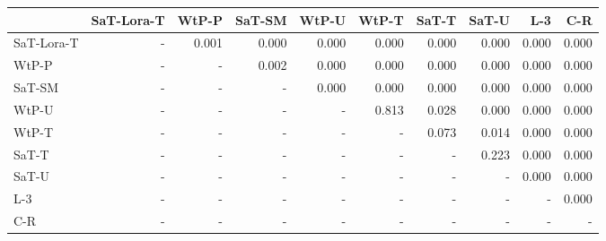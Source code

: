 \begin{tabular}{lrrrrrrrrr}
\toprule
 & SaT-Lora-T & WtP-P & SaT-SM & WtP-U & WtP-T & SaT-T & SaT-U & L-3 & C-R \\
\midrule
SaT-Lora-T & - & 0.001 & 0.000 & 0.000 & 0.000 & 0.000 & 0.000 & 0.000 & 0.000 \\
WtP-P & - & - & 0.002 & 0.000 & 0.000 & 0.000 & 0.000 & 0.000 & 0.000 \\
SaT-SM & - & - & - & 0.000 & 0.000 & 0.000 & 0.000 & 0.000 & 0.000 \\
WtP-U & - & - & - & - & 0.813 & 0.028 & 0.000 & 0.000 & 0.000 \\
WtP-T & - & - & - & - & - & 0.073 & 0.014 & 0.000 & 0.000 \\
SaT-T & - & - & - & - & - & - & 0.223 & 0.000 & 0.000 \\
SaT-U & - & - & - & - & - & - & - & 0.000 & 0.000 \\
L-3 & - & - & - & - & - & - & - & - & 0.000 \\
C-R & - & - & - & - & - & - & - & - & - \\
\bottomrule
\end{tabular}

